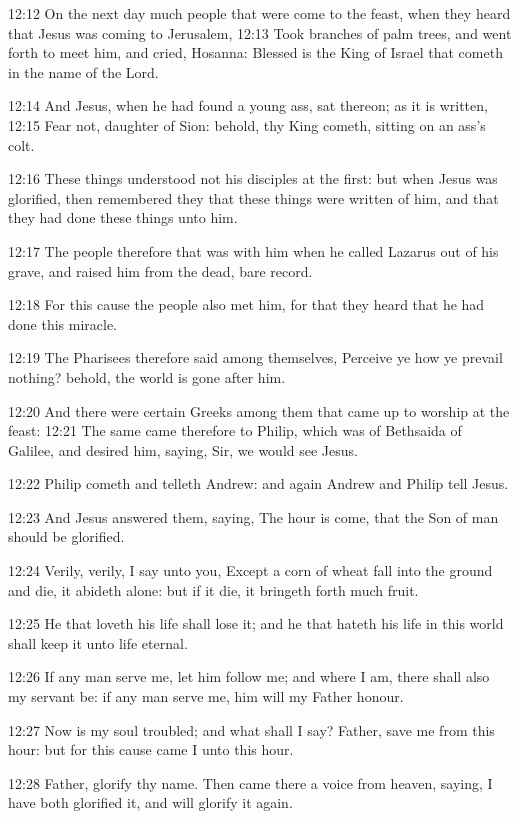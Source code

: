 12:12 On the next day much people that were come to the feast, when
they heard that Jesus was coming to Jerusalem, 12:13 Took branches of
palm trees, and went forth to meet him, and cried, Hosanna: Blessed is
the King of Israel that cometh in the name of the Lord.

12:14 And Jesus, when he had found a young ass, sat thereon; as it is
written, 12:15 Fear not, daughter of Sion: behold, thy King cometh,
sitting on an ass's colt.

12:16 These things understood not his disciples at the first: but when
Jesus was glorified, then remembered they that these things were
written of him, and that they had done these things unto him.

12:17 The people therefore that was with him when he called Lazarus
out of his grave, and raised him from the dead, bare record.

12:18 For this cause the people also met him, for that they heard that
he had done this miracle.

12:19 The Pharisees therefore said among themselves, Perceive ye how
ye prevail nothing? behold, the world is gone after him.

12:20 And there were certain Greeks among them that came up to worship
at the feast: 12:21 The same came therefore to Philip, which was of
Bethsaida of Galilee, and desired him, saying, Sir, we would see
Jesus.

12:22 Philip cometh and telleth Andrew: and again Andrew and Philip
tell Jesus.

12:23 And Jesus answered them, saying, The hour is come, that the Son
of man should be glorified.

12:24 Verily, verily, I say unto you, Except a corn of wheat fall into
the ground and die, it abideth alone: but if it die, it bringeth forth
much fruit.

12:25 He that loveth his life shall lose it; and he that hateth his
life in this world shall keep it unto life eternal.

12:26 If any man serve me, let him follow me; and where I am, there
shall also my servant be: if any man serve me, him will my Father
honour.

12:27 Now is my soul troubled; and what shall I say? Father, save me
from this hour: but for this cause came I unto this hour.

12:28 Father, glorify thy name. Then came there a voice from heaven,
saying, I have both glorified it, and will glorify it again.

